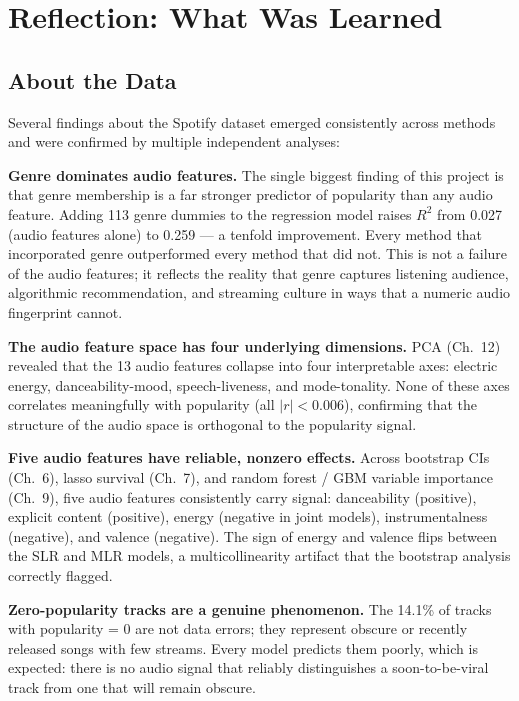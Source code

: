 \documentclass[12pt, oneside]{book}
\begin{document}
\section{Reflection: What Was Learned}
 
\subsection{About the Data}
 
Several findings about the Spotify dataset emerged consistently across methods and were confirmed by multiple independent analyses:
 
\textbf{Genre dominates audio features.} The single biggest finding of this project is that genre membership is a far stronger predictor of popularity than any audio feature. Adding 113 genre dummies to the regression model raises $R^2$ from 0.027 (audio features alone) to 0.259 --- a tenfold improvement. Every method that incorporated genre outperformed every method that did not. This is not a failure of the audio features; it reflects the reality that genre captures listening audience, algorithmic recommendation, and streaming culture in ways that a numeric audio fingerprint cannot.
 
\textbf{The audio feature space has four underlying dimensions.} PCA (Ch.\ 12) revealed that the 13 audio features collapse into four interpretable axes: electric energy, danceability-mood, speech-liveness, and mode-tonality. None of these axes correlates meaningfully with popularity (all $|r| < 0.006$), confirming that the structure of the audio space is orthogonal to the popularity signal.
 
\textbf{Five audio features have reliable, nonzero effects.} Across bootstrap CIs (Ch.\ 6), lasso survival (Ch.\ 7), and random forest / GBM variable importance (Ch.\ 9), five audio features consistently carry signal: danceability (positive), explicit content (positive), energy (negative in joint models), instrumentalness (negative), and valence (negative). The sign of energy and valence flips between the SLR and MLR models, a multicollinearity artifact that the bootstrap analysis correctly flagged.
 
\textbf{Zero-popularity tracks are a genuine phenomenon.} The 14.1\% of tracks with popularity = 0 are not data errors; they represent obscure or recently released songs with few streams. Every model predicts them poorly, which is expected: there is no audio signal that reliably distinguishes a soon-to-be-viral track from one that will remain obscure.
 
\end{document}
